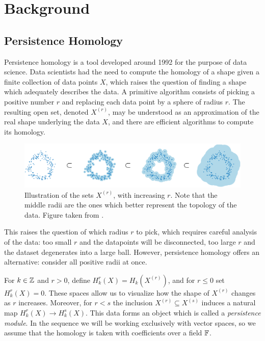 
\section{Background}

\subsection{Persistence Homology}

Persistence homology is a tool developed around 1992 for the purpose of data science. Data scientists had the need to compute the homology of a shape given a finite collection of data points $X$, which raises the question of finding a shape which adequately describes the data. A primitive algorithm consists of picking a positive number $r$ and replacing each data point by a sphere of radius $r$. The resulting open set, denoted $X^{(r)}$, may be understood as an approximation of the real shape underlying the data $X$, and there are efficient algorithms to compute its homology.

\begin{figure}
\centering
\includegraphics[width=\linewidth]{data}
\caption{Illustration of the sets $X^{(r)}$, with increasing $r$. Note that the middle radii are the ones which better represent the topology of the data. Figure taken from \cite{historypersistence}.}
\end{figure}

This raises the question of which radius $r$ to pick, which requires careful analysis of the data: too small $r$ and the datapoints will be disconnected, too large $r$ and the dataset degenerates into a large ball. However, persistence homology offers an alternative: consider all positive radii at once.

For $k \in \mathbb{Z}$ and $r > 0$, define $H_k^r(X) = H_k(X^{(r)})$, and for $r \leq 0$ set $H_k^r(X) = 0$. These spaces allow us to visualize how the shape of $X^{(r)}$ changes as $r$ increases. Moreover, for $r < s$ the inclusion $X^{(r)} \subseteq X^{(s)}$ induces a natural map $H_k^r(X) \to H_k^s(X)$. This data forms an object which is called a \emph{persistence module}. In the sequence we will be working exclusively with vector spaces, so we assume that the homology is taken with coefficients over a field $\mathbb{F}$.

